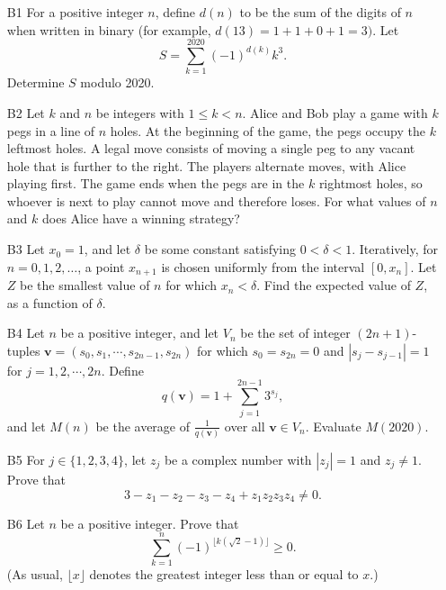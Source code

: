 \documentclass[amssymb,twocolumn,pra,10pt,aps,nofootinbib]{revtex4-1}
\begin{document}
\begin{itemize}
\item[B1]
For a positive integer $n$, define $d(n)$ to be the sum of the digits of $n$ when written in binary (for example, $d(13) = 1+1+0+1=3)$. Let
\[
S = \sum_{k=1}^{2020} (-1)^{d(k)} k^3.
\]
Determine $S$ modulo 2020.

\item[B2]
Let $k$ and $n$ be integers with $1 \leq k < n$. Alice and Bob play a game with $k$ pegs in a line of $n$ holes. At the beginning of the game, the pegs occupy the $k$ leftmost holes. A legal move consists of moving a single peg
to any vacant hole that is further to the right. The players alternate moves, with Alice playing first. The game ends when the pegs are in the $k$ rightmost holes, so whoever is next to play cannot move and therefore loses. For what values
of $n$ and $k$ does Alice have a winning strategy?

\item[B3]
Let $x_0 = 1$, and let $\delta$ be some constant satisfying $0 < \delta < 1$. Iteratively, for $n=0,1,2,\dots$, a point $x_{n+1}$ is chosen uniformly from the interval $[0, x_n]$. Let $Z$ be the smallest value of $n$ for which $x_n < \delta$.
Find the expected value of $Z$, as a function of $\delta$.

\item[B4]
Let $n$ be a positive integer, and let $V_n$ be the set of integer $(2n+1)$-tuples $\mathbf{v} = (s_0, s_1, \cdots, s_{2n-1}, s_{2n})$ for which $s_0 = s_{2n} = 0$ and $|s_j - s_{j-1}| = 1$ for $j=1,2,\cdots,2n$. Define
\[
q(\mathbf{v}) = 1 + \sum_{j=1}^{2n-1} 3^{s_j},
\]
and let $M(n)$ be the average of $\frac{1}{q(\mathbf{v})}$ over all $\mathbf{v} \in V_n$. Evaluate $M(2020)$.

\item[B5]
For $j \in \{1, 2, 3, 4\}$, let $z_j$ be a complex number with $|z_j| = 1$ and $z_j \neq 1$. Prove that
\[
3 - z_1 - z_2 - z_3 - z_4 + z_1 z_2 z_3 z_4 \neq 0.
\]

\item[B6]
Let $n$ be a positive integer. Prove that
\[
\sum_{k=1}^n (-1)^{\lfloor k(\sqrt{2}-1) \rfloor} \geq 0.
\]
(As usual, $\lfloor x \rfloor$ denotes the greatest integer less than or equal to $x$.)

\end{itemize}
\end{document}
